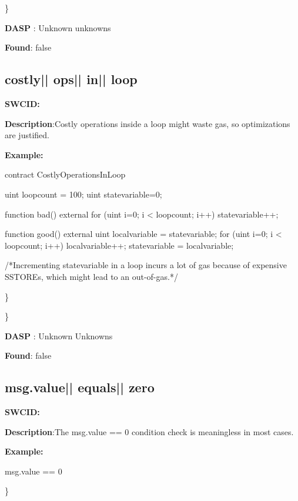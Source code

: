 \documentclass{article}
\begin{document}
\} 

\textbf{DASP} : Unknown unknowns

\textbf{Found}: false

\subsection{costly{|\textunderscore| }ops{|\textunderscore| }in{|\textunderscore| }loop} 
\textbf{SWC{\textunderscore }ID:} 

\textbf{Description}:Costly operations inside a loop might waste gas, so optimizations are justified.


\textbf{Example:} 
\begin{ffcode} 

contract CostlyOperationsInLoop{

    uint loop\textunderscore count = 100;
    uint state\textunderscore variable=0;

    function bad() external{
        for (uint i=0; i < loop\textunderscore count; i++){
            state\textunderscore variable++;
        }
    }

    function good() external{
      uint local\textunderscore variable = state\textunderscore variable;
      for (uint i=0; i < loop\textunderscore count; i++){
        local\textunderscore variable++;
      }
      state\textunderscore variable = local\textunderscore variable;
    }
}
 /*Incrementing state\textunderscore variable in a loop incurs a lot of gas because of expensive SSTOREs, which might lead to an out-of-gas.*/ 

\end{ffcode} 
\} 

\} 

\textbf{DASP} : Unknown Unknowns

\textbf{Found}: false

\subsection{msg.value{|\textunderscore| }equals{|\textunderscore| }zero} 
\textbf{SWC{\textunderscore }ID:} 

\textbf{Description}:The msg.value == 0 condition check is meaningless in most cases.


\textbf{Example:} 
\begin{ffcode} 

msg.value == 0

\end{ffcode} 
\} 
\end{document}

